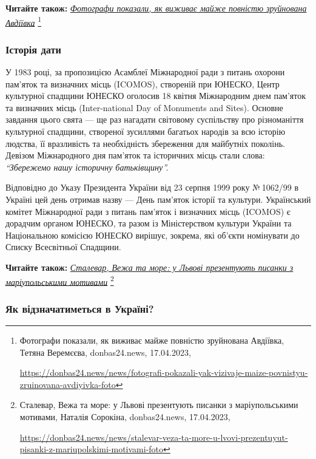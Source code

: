 \textbf{Читайте також:} \href{https://donbas24.news/news/fotografi-pokazali-yak-vizivaje-maize-povnistyu-zruinovana-avdiyivka-foto}{\emph{Фотографи показали, як виживає майже повністю зруйнована Авдіївка}}%
\footnote{Фотографи показали, як виживає майже повністю зруйнована Авдіївка, Тетяна Веремєєва, donbas24.news, 17.04.2023, \par%
\url{https://donbas24.news/news/fotografi-pokazali-yak-vizivaje-maize-povnistyu-zruinovana-avdiyivka-foto}%
}

\subsubsection{Історія дати}

У 1983 році, за пропозицією Асамблеї Міжнародної ради з питань охорони пам'яток
та визначних місць (ICOMOS), створеній при ЮНЕСКО, Центр культурної спадщини
ЮНЕСКО оголосив 18 квітня Міжнародним днем пам'яток та визначних місць
(Inter\hyp{}national Day of Monuments and Sites). Основне завдання цього свята — ще
раз нагадати світовому суспільству про різноманіття культурної спадщини,
створеної зусиллями багатьох народів за всю історію людства, її вразливість та
необхідність збереження для майбутніх поколінь. Девізом Міжнародного дня
пам'яток та історичних місць стали слова: \emph{\enquote{Збережемо нашу історичну
батьківщину}.}

Відповідно до Указу Президента України від 23 серпня 1999 року № 1062/99 в
Україні цей день отримав назву — День пам'яток історії та культури. Український
комітет Міжнародної ради з питань пам'яток і визначних місць (ICOMOS) є
дорадчим органом ЮНЕСКО, та разом із Міністерством культури України та
Національною комісією ЮНЕСКО вирішує, зокрема, які об'єкти номінувати до Списку
Всесвітньої Спадщини.

\textbf{Читайте також:} \href{https://donbas24.news/news/stalevar-veza-ta-more-u-lvovi-prezentuyut-pisanki-z-mariupolskimi-motivami-foto}{\emph{Сталевар, Вежа та море: у Львові презентують писанки з маріупольськими мотивами}}%
\footnote{Сталевар, Вежа та море: у Львові презентують писанки з маріупольськими мотивами, Наталія Сорокіна, donbas24.news, 17.04.2023, \par%
\url{https://donbas24.news/news/stalevar-veza-ta-more-u-lvovi-prezentuyut-pisanki-z-mariupolskimi-motivami-foto}%
}


\subsubsection{Як відзначатиметься в Україні?}

